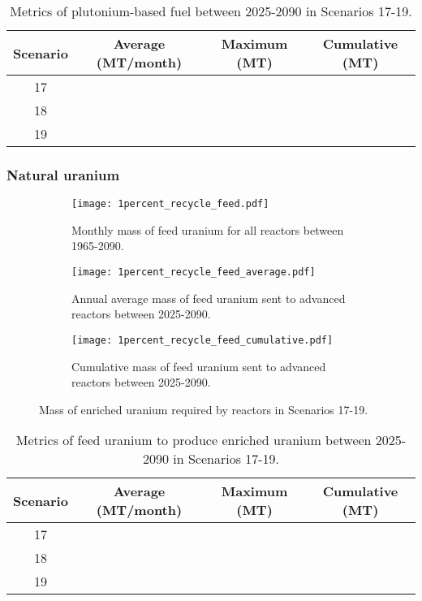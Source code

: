 \begin{table}[h!]
    \centering 
    \caption{Metrics of plutonium-based fuel between 2025-2090 in Scenarios 
    17-19.}
    \label{tab:pufuel_17-19}
    \begin{tabular}{c c c c}
        \hline 
        Scenario & Average (MT/month) & Maximum (MT) & Cumulative (MT) \\
        \hline
        17 &  &  & \\
        18 &  &  & \\
        19 &  &  & \\
        \hline
    \end{tabular}
\end{table}

\subsubsection{Natural uranium}

\begin{figure}[h!]
    \centering
    \begin{subfigure}[b]{0.45\textwidth}
        \centering
        \texttt{[image: 1percent\_recycle\_feed.pdf]}
        \caption{Monthly mass of feed uranium for all reactors 
        between 1965-2090.}
        \label{fig:1percent_recycle_all_feed}
    \end{subfigure}
    \hfill
    \begin{subfigure}[b]{0.45\textwidth}
        \centering
        \texttt{[image: 1percent\_recycle\_feed\_average.pdf]}
        \caption{Annual average mass of feed uranium sent to 
        advanced reactors between 2025-2090.}
        \label{fig:1percent_recycle_AR_feed}
    \end{subfigure}
    \begin{subfigure}[b]{0.45\textwidth}
        \centering
        \texttt{[image: 1percent\_recycle\_feed\_cumulative.pdf]}
        \caption{Cumulative mass of feed
        uranium sent to advanced reactors between 2025-2090.}
        \label{fig:1percent_recycle_feed_cumulative}
    \end{subfigure}
       \caption{Mass of enriched uranium required by reactors
        in Scenarios 17-19.}
       \label{fig:1percent_recycle_feed}
\end{figure}

\begin{table}[h!]
    \centering 
    \caption{Metrics of feed uranium to produce enriched uranium 
    between 2025-2090 in Scenarios 
    17-19.}
    \label{tab:feedu_17-19}
    \begin{tabular}{c c c c}
        \hline 
        Scenario & Average (MT/month) & Maximum (MT) & Cumulative (MT) \\
        \hline
        17 &  &  & \\
        18 &  &  & \\
        19 &  &  & \\
        \hline
    \end{tabular}
\end{table}

